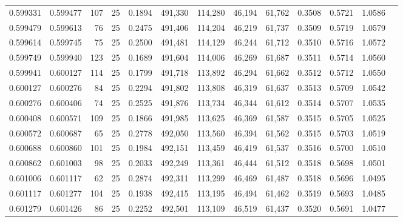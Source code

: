 \begin{tabular}{rrrrrrrrrrrrr}
0.599331 & 0.599477 &   107 &  25 &                                     0.1894 & 491,330 & 114,280 &  46,194 &  61,762 & 0.3508 & 0.5721 & 1.0586 \\
0.599479 & 0.599613 &    76 &  25 &                                     0.2475 & 491,406 & 114,204 &  46,219 &  61,737 & 0.3509 & 0.5719 & 1.0579 \\
0.599614 & 0.599745 &    75 &  25 &                                     0.2500 & 491,481 & 114,129 &  46,244 &  61,712 & 0.3510 & 0.5716 & 1.0572 \\
0.599749 & 0.599940 &   123 &  25 &                                     0.1689 & 491,604 & 114,006 &  46,269 &  61,687 & 0.3511 & 0.5714 & 1.0560 \\
0.599941 & 0.600127 &   114 &  25 &                                     0.1799 & 491,718 & 113,892 &  46,294 &  61,662 & 0.3512 & 0.5712 & 1.0550 \\
0.600127 & 0.600276 &    84 &  25 &                                     0.2294 & 491,802 & 113,808 &  46,319 &  61,637 & 0.3513 & 0.5709 & 1.0542 \\
0.600276 & 0.600406 &    74 &  25 &                                     0.2525 & 491,876 & 113,734 &  46,344 &  61,612 & 0.3514 & 0.5707 & 1.0535 \\
0.600408 & 0.600571 &   109 &  25 &                                     0.1866 & 491,985 & 113,625 &  46,369 &  61,587 & 0.3515 & 0.5705 & 1.0525 \\
0.600572 & 0.600687 &    65 &  25 &                                     0.2778 & 492,050 & 113,560 &  46,394 &  61,562 & 0.3515 & 0.5703 & 1.0519 \\
0.600688 & 0.600860 &   101 &  25 &                                     0.1984 & 492,151 & 113,459 &  46,419 &  61,537 & 0.3516 & 0.5700 & 1.0510 \\
0.600862 & 0.601003 &    98 &  25 &                                     0.2033 & 492,249 & 113,361 &  46,444 &  61,512 & 0.3518 & 0.5698 & 1.0501 \\
0.601006 & 0.601117 &    62 &  25 &                                     0.2874 & 492,311 & 113,299 &  46,469 &  61,487 & 0.3518 & 0.5696 & 1.0495 \\
0.601117 & 0.601277 &   104 &  25 &                                     0.1938 & 492,415 & 113,195 &  46,494 &  61,462 & 0.3519 & 0.5693 & 1.0485 \\
0.601279 & 0.601426 &    86 &  25 &                                     0.2252 & 492,501 & 113,109 &  46,519 &  61,437 & 0.3520 & 0.5691 & 1.0477 \\

\end{tabular}
